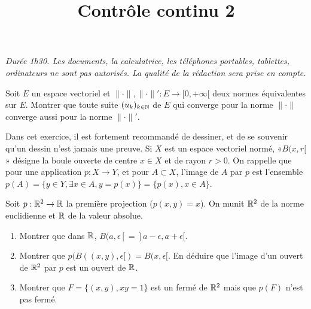 \documentclass[a4paper]{tp_um}
\title{\large \sffamily\bfseries Contrôle continu 2}
\begin{document}
\maketitle
\textit{Durée 1h30. Les documents, la calculatrice, les téléphones portables, tablettes, ordinateurs ne sont pas autorisés. La qualité de la rédaction sera prise en compte.} 

\bigskip
\bigskip

 Soit $E$ un espace vectoriel et $\|\cdot\|, \|\cdot\|': E \to [0,+\infty[$  deux normes équivalentes sur $E$. Montrer que toute suite $(u_{k})_{k\in\mathbb{N}}$  de $E$ qui converge pour la norme $\|\cdot\|$ converge aussi pour la norme $\|\cdot\|'$.
		\blanc{8cm}


 Dans cet exercice, il est fortement recommand\'e de dessiner, et de se souvenir qu'un dessin n'est jamais une preuve.  Si $X$ est un espace vectoriel normé, «$B(x,r[$» désigne la boule ouverte de centre $x\in X$ et de rayon $r>0$. On rappelle que pour une application $p:X\rightarrow Y$, et pour $A\subset X$, l'image de $A$ par $p$ est l'ensemble $p(A)=\{ y\in  Y, \exists x\in A, y=p(x)\}=\{ p(x), x \in A\}$. 

Soit $p:{\Bbb R}^2\rightarrow {\Bbb R}$ la premi\`ere projection ($p(x,y)=x$). On munit ${\Bbb R}^2$ de la norme euclidienne et $\Bbb R$ de la valeur absolue. %
\begin{enumerate}
\item Montrer que dans $\Bbb R$, $B(a,\epsilon[=]a-\epsilon,a+\epsilon[$.  
			\blanc{6cm}
\item Montrer que $p(B((x,y),\epsilon[)=B(x,\epsilon[$. En d\'eduire que l'image d'un ouvert de ${\Bbb R}^2$ par $p$ est un ouvert de $\Bbb R$.
			\blanc{10cm}
\item Montrer que $F=\{(x,y), xy=1\}$ est un ferm\'e de ${\Bbb R}^2$ mais que $p(F)$ n'est pas ferm\'e.
			\blanc{10cm}
\end{enumerate}
\end{document}
